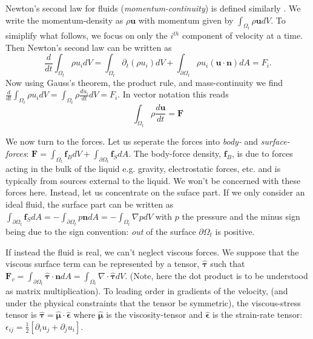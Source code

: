 \documentclass[rmp,aps,nofootinbib,superscriptaddress,floatfix,10pt]{revtex4-2}
\begin{document}
Newton's second law for fluids (\emph{momentum-continuity}) is defined similarly \cite{schoeffel2014lecture,mcdonough2009lectures}. We write the momentum-density as $\rho \bm{u}$ with momentum given by $\int_{\Omega_t} \rho \bm{u} dV$. To simiplify what follows, we focus on only the $i^{th}$ component of velocity at a time. Then Newton's second law can be written as 
\begin{equation}
    \frac{d}{dt} \int_{\Omega_t} \rho u_i dV =  \int_{\Omega_t} \partial_t (\rho u_i) dV+\int_{\partial \Omega_t} \rho u_i ( \bm{u} \cdot \bm{n}) dA = F_i.
\end{equation}
Now using Gauss's theorem, the product rule, and mass-continuity we find $ \frac{d}{dt} \int_{\Omega_t} \rho u_i dV =  \int_{\Omega_t} \rho \frac{d u_i}{dt} dV = F_i $. In vector notation this reads
\begin{equation}
    \int_{\Omega_t} \rho \frac{d \bm{u}}{dt} = \bm{F}
    \label{eq:mom_continuity}
\end{equation}

We now turn to the forces. Let us seperate the forces into \emph{body-} and \emph{surface-forces}: $\bm{F}=\int_{\Omega_t} \bm{f}_B dV+ \int_{\partial \Omega_t} \bm{f}_S dA $. The body-force density, $\bm{f}_B$, is due to forces acting in the bulk of the liquid e.g. gravity, electrostatic forces, etc. and is typically from sources external to the liquid. We won't be concerned with these forces here. Instead, let us concentrate on the suface part. If we only consider an ideal fluid, the surface part can be written as $\int_{\partial \Omega_t} \bm{f}_S dA =-\int_{\partial \Omega_t} p \bm{n} dA = -\int_{\Omega_t}\nabla p dV$ with $p$ the pressure  and the minus sign being due to the sign convention: \emph{out} of the surface $\partial \Omega_t$ is positive. 

If instead the fluid is real, we can't neglect viscous forces. We suppose that the viscous surface term can be represented by a tensor, $\hat{\bm{\tau}}$ such that $\bm{F}_v=\int_{\partial \Omega_t} \hat{\bm{\tau}}\cdot \bm{n} dA = \int_{\Omega_t} \nabla \cdot \hat{\bm{\tau}} dV$. (Note, here the dot product is to be understood as matrix multiplication). To leading order in gradients of the velocity, (and under the physical constraints that the tensor be symmetric), the viscous-stress tensor is $\hat{\bm{\tau}}=\hat{\bm{\mu}}\cdot \hat{\bm{\epsilon}}$ where $\hat{\bm{\mu}}$ is the viscosity-tensor and $\hat{\bm{\epsilon}}$ is the strain-rate tensor: $\epsilon_{ij}=\frac{1}{2}\left[ \partial_i u_j+ \partial_j u_i \right]$. 
\end{document}
